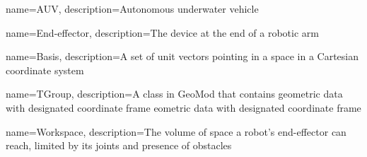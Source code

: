 {
        name=AUV,
        description={Autonomous underwater vehicle}
}

{
        name=End-effector,
        description={The device at the end of a robotic arm}
}


{
        name=Basis,
        description={A set of unit vectors pointing in a space in a Cartesian coordinate system}
}

{
        name=TGroup,
        description={A class in GeoMod that contains geometric data with designated coordinate frame eometric data with designated coordinate frame}
}

{
        name=Workspace,
        description={The volume of space a robot's end-effector can reach, limited by its joints and presence of obstacles}
}
